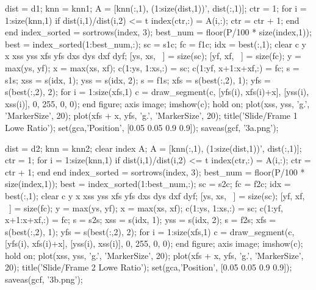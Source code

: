 dist = d1;
knn = knn1;
A = [knn(:,1), (1:size(dist,1))', dist(:,1)];
ctr = 1;
for i = 1:size(knn,1)
    if dist(i,1)/dist(i,2) <= t
        index(ctr,:) = A(i,:);
        ctr = ctr + 1;
    end
end
index_sorted = sortrows(index, 3);
best_num = floor(P/100 * size(index,1));
best = index_sorted(1:best_num,:);
sc = s1c;
fc = f1c;
idx = best(:,1);
clear c y x xss yss xfs yfs dxs dys dxf dyf;
[ys, xs, ~] = size(sc);
[yf, xf, ~] = size(fc);
y = max(ys, yf);
x = max(xs, xf);
c(1:ys, 1:xs,:) = sc;
c(1:yf, x+1:x+xf,:) = fc;
s = s1s;
xss = s(idx, 1);
yss = s(idx, 2);
s = f1s;
xfs = s(best(:,2), 1);
yfs = s(best(:,2), 2);
for i = 1:size(xfs,1)
    c = draw_segment(c, [yfs(i), xfs(i)+x], [yss(i), xss(i)], 0, 255, 0, 0);
end
figure;
axis image;
imshow(c);
hold on;
plot(xss, yss, 'g.', 'MarkerSize', 20);
plot(xfs + x, yfs, 'g.', 'MarkerSize', 20);
title('Slide/Frame 1 Lowe Ratio');
set(gca,'Position', [0.05 0.05 0.9 0.9]);
saveas(gcf, '3a.png');

dist = d2;
knn = knn2;
clear index A;
A = [knn(:,1), (1:size(dist,1))', dist(:,1)];
ctr = 1;
for i = 1:size(knn,1)
    if dist(i,1)/dist(i,2) <= t
        index(ctr,:) = A(i,:);
        ctr = ctr + 1;
    end
end
index_sorted = sortrows(index, 3);
best_num = floor(P/100 * size(index,1));
best = index_sorted(1:best_num,:);
sc = s2c;
fc = f2c;
idx = best(:,1);
clear c y x xss yss xfs yfs dxs dys dxf dyf;
[ys, xs, ~] = size(sc);
[yf, xf, ~] = size(fc);
y = max(ys, yf);
x = max(xs, xf);
c(1:ys, 1:xs,:) = sc;
c(1:yf, x+1:x+xf,:) = fc;
s = s2s;
xss = s(idx, 1);
yss = s(idx, 2);
s = f2s;
xfs = s(best(:,2), 1);
yfs = s(best(:,2), 2);
for i = 1:size(xfs,1)
    c = draw_segment(c, [yfs(i), xfs(i)+x], [yss(i), xss(i)], 0, 255, 0, 0);
end
figure;
axis image;
imshow(c);
hold on;
plot(xss, yss, 'g.', 'MarkerSize', 20);
plot(xfs + x, yfs, 'g.', 'MarkerSize', 20);
title('Slide/Frame 2 Lowe Ratio');
set(gca,'Position', [0.05 0.05 0.9 0.9]);
saveas(gcf, '3b.png');

